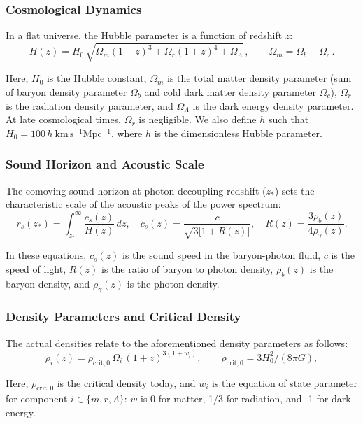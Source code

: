 \documentclass[11pt]{article}
\theoremstyle{definition}
\begin{document}
\subsubsection{Cosmological Dynamics}
In a flat universe, the Hubble parameter is a function of redshift \(z\):
\begin{equation}
  H(z)
  = H_0\,\sqrt{\Omega_m(1+z)^3 + \Omega_r(1+z)^4 + \Omega_\Lambda}\,,
  \qquad
  \Omega_m = \Omega_b + \Omega_c\,.
\end{equation}

Here, $H_0$ is the Hubble constant, $\Omega_m$ is the total matter density parameter (sum of baryon density parameter $\Omega_b$ and cold dark matter density parameter $\Omega_c$), $\Omega_r$ is the radiation density parameter, and $\Omega_\Lambda$ is the dark energy density parameter. At late cosmological times, \(\Omega_r\) is negligible. We also define
\( h \) such that 
\(H_0 = 100\,h\ \mathrm{km\,s^{-1}Mpc^{-1}}\), where $h$ is the dimensionless Hubble parameter.

\subsubsection{Sound Horizon and Acoustic Scale}
The comoving sound horizon at photon decoupling redshift (\(z_*\)) sets the characteristic scale
of the acoustic peaks of the power spectrum:
\begin{equation}
  r_s(z_*) 
  = \int_{z_*}^\infty \frac{c_s(z)}{H(z)}\,dz,
  \quad
  c_s(z) = \frac{c}{\sqrt{3\bigl[1+R(z)\bigr]}},
  \quad
  R(z)=\frac{3\rho_b(z)}{4\rho_\gamma(z)}.
\end{equation}

In these equations, $c_s(z)$ is the sound speed in the baryon-photon fluid, $c$ is the speed of light, $R(z)$ is the ratio of baryon to photon density, $\rho_b(z)$ is the baryon density, and $\rho_\gamma(z)$ is the photon density.

\subsubsection{Density Parameters and Critical Density}
The actual densities relate to the aforementioned density parameters as follows:
\begin{equation}
   \rho_i(z) = \rho_{\mathrm{crit},0} \, \Omega_i \, (1+z)^{3(1+w_i)},
  \qquad
  \rho_{\mathrm{crit},0} = 3H_0^2/(8\pi G),
\end{equation}

  Here, \( \rho_{\mathrm{crit},0} \) is the critical density
  today, and \( w_i \) is the equation of state parameter for component \( i \in \{ m, r, \Lambda \}\): \( w \) is 0 for matter, 1/3 for radiation, and -1 for dark energy.   
  
\end{document}
